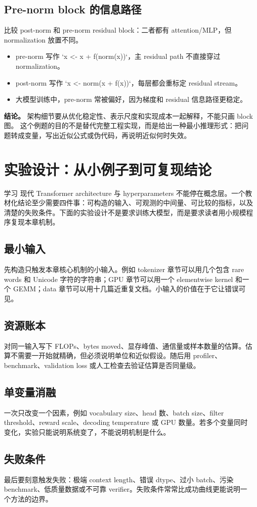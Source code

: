 \documentclass[a4paper]{article}
\begin{document}
\subsection{Pre-norm block 的信息路径}
比较 post-norm 和 pre-norm residual block：二者都有 attention/MLP，但 normalization 放置不同。
\begin{itemize}
\item pre-norm 写作 `x <- x + f(norm(x))`，主 residual path 不直接穿过 normalization。
\item post-norm 写作 `x <- norm(x + f(x))`，每层都会重标定 residual stream。
\item 大模型训练中，pre-norm 常被偏好，因为梯度和 residual 信息路径更稳定。
\end{itemize}
\textbf{结论。} 架构细节要从优化稳定性、表示尺度和实现成本一起解释，不能只画 block 图。
这个例题的目的不是替代完整工程实现，而是给出一种最小推理形式：把问题转成变量，写出近似公式或伪代码，再说明近似何时失效。
\section{实验设计：从小例子到可复现结论}
学习 现代 Transformer architecture 与 hyperparameters 不能停在概念层。一个教材化结论至少需要四件事：可构造的输入、可观测的中间量、可比较的指标，以及清楚的失败条件。下面的实验设计不是要求训练大模型，而是要求读者用小规模程序复现本章机制。
\subsection{最小输入}
先构造只触发本章核心机制的小输入。例如 tokenizer 章节可以用几个包含 rare words 和 Unicode 字符的字符串；GPU 章节可以用一个 elementwise kernel 和一个 GEMM；data 章节可以用十几篇近重复文档。小输入的价值在于它让错误可见。
\subsection{资源账本}
对同一输入写下 FLOPs、bytes moved、显存峰值、通信量或样本数量的估算。估算不需要一开始就精确，但必须说明单位和近似假设。随后用 profiler、benchmark、validation loss 或人工检查去验证估算是否同量级。
\subsection{单变量消融}
一次只改变一个因素，例如 vocabulary size、head 数、batch size、filter threshold、reward scale、decoding temperature 或 GPU 数量。若多个变量同时变化，实验只能说明系统变了，不能说明机制是什么。
\subsection{失败条件}
最后要刻意触发失败：极端 context length、错误 dtype、过小 batch、污染 benchmark、低质量数据或不可靠 verifier。失败条件常常比成功曲线更能说明一个方法的边界。
\end{document}
